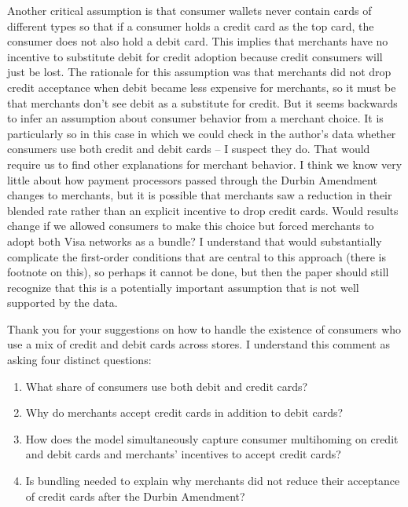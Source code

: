 \documentclass[main.tex]{subfiles}
\begin{document}
\begin{refsection}
\begin{refcomment}
Another critical assumption is that consumer wallets never contain cards of different types so that if a consumer holds a credit card as the top card, the consumer does not also hold a debit card.
This implies that merchants have no incentive to substitute debit for credit adoption because credit consumers will just be lost.
The rationale for this assumption was that merchants did not drop credit acceptance when debit became less expensive for merchants, so it must be that merchants don't see debit as a substitute for credit.
But it seems backwards to infer an assumption about consumer behavior from a merchant choice.
It is particularly so in this case in which we could check in the author's data whether consumers use both credit and debit cards -- I suspect they do.
That would require us to find other explanations for merchant behavior.
I think we know very little about how payment processors passed through the Durbin Amendment changes to merchants, but it is possible that merchants saw a reduction in their blended rate rather than an explicit incentive to drop credit cards.
Would results change if we allowed consumers to make this choice but forced merchants to adopt both Visa networks as a bundle?
I understand that would substantially complicate the first-order conditions that are central to this approach (there is footnote on this), so perhaps it cannot be done, but then the paper should still recognize that this is a potentially important assumption that is not well supported by the data.
\end{refcomment}

Thank you for your suggestions on how to handle the existence of consumers who use a mix of credit and debit cards across stores.
I understand this comment as asking four distinct questions:

\begin{enumerate}
    \item What share of consumers use both debit and credit cards?
    \item Why do merchants accept credit cards in addition to debit cards?
    \item How does the model simultaneously capture consumer multihoming on credit and debit cards and merchants' incentives to accept credit cards?
    \item Is bundling needed to explain why merchants did not reduce their acceptance of credit cards after the Durbin Amendment?
\end{enumerate}


\end{refsection}
\end{document}

